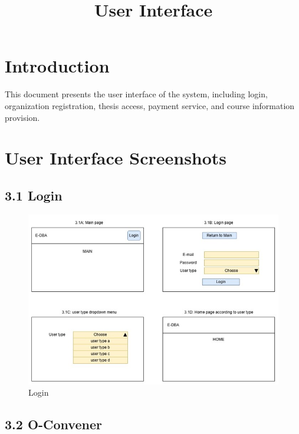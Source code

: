 \documentclass[a4paper,12pt]{article}
\title{User Interface}
\author{}
\date{}
\begin{document}
\maketitle

\section{Introduction}
This document presents the user interface of the system, including login, organization registration, thesis access, payment service, and course information provision.


\section{User Interface Screenshots}

\subsection*{3.1 Login}

\begin{figure}[H]
    \begin{center}
        \includegraphics[width=\textwidth]{picture/Picture3122.jpg}
        \caption{Login}
        \label{fig:login}
    \end{center}
\end{figure}

\subsection*{3.2 O-Convener}
\end{document}
